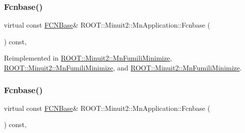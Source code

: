 \mbox{\label{classROOT_1_1Minuit2_1_1MnApplication_af4eb3fe4927d3a8e0efcd5c6b7100881}} 
\subsubsection{\texorpdfstring{Fcnbase()}{Fcnbase()}\hspace{0.1cm}{\footnotesize\ttfamily [2/3]}}
{\footnotesize\ttfamily virtual const \mbox{\hyperlink{classROOT_1_1Minuit2_1_1FCNBase}{F\+C\+N\+Base}}\& R\+O\+O\+T\+::\+Minuit2\+::\+Mn\+Application\+::\+Fcnbase (\begin{DoxyParamCaption}{ }\end{DoxyParamCaption}) const\hspace{0.3cm}{\ttfamily [inline]}, {\ttfamily [virtual]}}



Reimplemented in \mbox{\hyperlink{classROOT_1_1Minuit2_1_1MnFumiliMinimize_a4540fd0311c15810965864988d4c70d1}{R\+O\+O\+T\+::\+Minuit2\+::\+Mn\+Fumili\+Minimize}}, \mbox{\hyperlink{classROOT_1_1Minuit2_1_1MnFumiliMinimize_a4540fd0311c15810965864988d4c70d1}{R\+O\+O\+T\+::\+Minuit2\+::\+Mn\+Fumili\+Minimize}}, and \mbox{\hyperlink{classROOT_1_1Minuit2_1_1MnFumiliMinimize_a4540fd0311c15810965864988d4c70d1}{R\+O\+O\+T\+::\+Minuit2\+::\+Mn\+Fumili\+Minimize}}.

\mbox{\label{classROOT_1_1Minuit2_1_1MnApplication_af4eb3fe4927d3a8e0efcd5c6b7100881}} 
\subsubsection{\texorpdfstring{Fcnbase()}{Fcnbase()}\hspace{0.1cm}{\footnotesize\ttfamily [3/3]}}
{\footnotesize\ttfamily virtual const \mbox{\hyperlink{classROOT_1_1Minuit2_1_1FCNBase}{F\+C\+N\+Base}}\& R\+O\+O\+T\+::\+Minuit2\+::\+Mn\+Application\+::\+Fcnbase (\begin{DoxyParamCaption}{ }\end{DoxyParamCaption}) const\hspace{0.3cm}{\ttfamily [inline]}, {\ttfamily [virtual]}}



